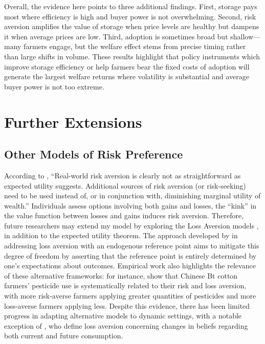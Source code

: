 Overall, the evidence here points to three additional findings. First, storage pays most where efficiency is high and buyer power is not overwhelming. Second, risk aversion amplifies the value of storage when price levels are healthy but dampens it when average prices are low. Third, adoption is sometimes broad but shallow---many farmers engage, but the welfare effect stems from precise timing rather than large shifts in volume. These results highlight that policy instruments which improve storage efficiency or help farmers bear the fixed costs of adoption will generate the largest welfare returns where volatility is substantial and average buyer power is not too extreme.




\section{Further Extensions}

\subsection{Other Models of Risk Preference}
\noindent According to \cite{o2018modeling}, ``Real-world risk aversion is clearly not as straightforward as expected utility suggests. Additional sources of risk aversion (or risk-seeking) need to be used instead of, or in conjunction with, diminishing marginal utility of wealth.'' Individuals assess options involving both gains and losses, the ``kink'' in the value function between losses and gains induces risk aversion. Therefore, future researchers may extend my model by exploring the Loss Aversion models \citep{kahneman1979prospect}, in addition to the expected utility theorem. The approach developed by \cite{kHoszegi2006model, kHoszegi2007reference, kHoszegi2009reference} in addressing loss aversion with an endogenous reference point aims to mitigate this degree of freedom by asserting that the reference point is entirely determined by one's expectations about outcomes. Empirical work also highlights the relevance of these alternative frameworks: for instance, \cite{liu2013risk} show that Chinese Bt cotton farmers' pesticide use is systematically related to their risk and loss aversion, with more risk-averse farmers applying greater quantities of pesticides and more loss-averse farmers applying less. Despite this evidence, there has been limited progress in adapting alternative models to dynamic settings, with a notable exception of \cite{kHoszegi2009reference}, who define loss aversion concerning changes in beliefs regarding both current and future consumption.



